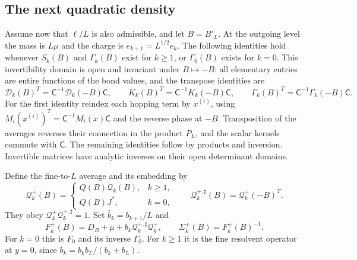 \subsection{The next quadratic density}
\label{subsec:rg-step-scale-identification}

Assume now that $\ell/L$ is also admissible, and let
$B=B'_L$. At the outgoing level the mass is $L\mu$ and
the charge is $e_{k+1}=L^{1/2}e_k$.
The following identities hold whenever $S_k(B)$ and
$\Gamma_k(B)$ exist for $k\ge1$, or $\Gamma_0(B)$
exists for $k=0$. This invertibility domain is open
and invariant under $B\mapsto-B$: all elementary
entries are entire functions of the bond values,
and the transpose identities are
\begin{equation}\label{eq:rg-step-transpose}
 \mathcal D_k(B)^T=\mathsf C^{-1}\mathcal D_k(-B)\mathsf C,\qquad
 K_k(B)^T=\mathsf C^{-1}K_k(-B)\mathsf C,\qquad
 \Gamma_k(B)^T=\mathsf C^{-1}\Gamma_k(-B)\mathsf C.
\end{equation}
For the first identity reindex each hopping term by
$x^{(i)}$, using
$M_i(x^{(i)})^T=\mathsf C^{-1}M_i(x)\mathsf C$
and the reverse phase at $-B$. Transposition of the
averages reverses their connection in the product
$P_L$, and the scalar kernels commute with
$\mathsf C$. The remaining identities follow by
products and inversion. Invertible matrices have
analytic inverses on their open determinant domains.

Define the fine-to-$L$ average and its embedding by
\[
 \mathcal Q_k^+(B)=
 \begin{cases}Q(B)\mathcal Q_k(B),&k\ge1,\\Q(B)J^*,&k=0,\end{cases}
 \qquad
 \mathcal Q_k^{+,\sharp}(B)=\mathcal Q_k^+(-B)^T.
\]
They obey
$\mathcal Q_k^+\mathcal Q_k^{+,\sharp}=1$.
Set $\bar b_k=b_{k+1}/L$ and
\begin{equation}\label{eq:rg-step-fine-plus}
 F_k^+(B)=D_B+\mu+\bar b_k\mathcal Q_k^{+,\sharp}\mathcal Q_k^+,
 \qquad \Sigma_k^+(B)=F_k^+(B)^{-1}.
\end{equation}
For $k=0$ this is $F_0$ and its inverse $\Gamma_0$.
For $k\ge1$ it is the fine resolvent operator at
$y=0$, since
$\bar b_k=b_kb_L/(b_k+b_L)$.

